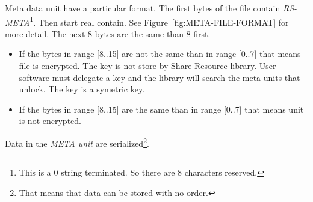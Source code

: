 Meta data unit have a particular format.
The first bytes of the file contain \emph{RS-META}\footnote{This is a 0 string terminated. So there are 8 characters reserved.}.
Then start real contain.
See Figure~\ref{fig:META-FILE-FORMAT} for more detail.
The next 8 bytes are the same than 8 first.
\begin{itemize}
 \item If the bytes in range [8..15] are not the same than in range [0..7] that means file is encrypted.
The key is not store by Share Resource library.
User software must delegate a key and the library will search the meta units that unlock.
The key is a symetric key.
 \item If the bytes in range [8..15] are the same than in range [0..7] that means unit is not encrypted.
\end{itemize}


Data in the \emph{META unit} are serialized\footnote{That means that data can be stored with no order.}.




